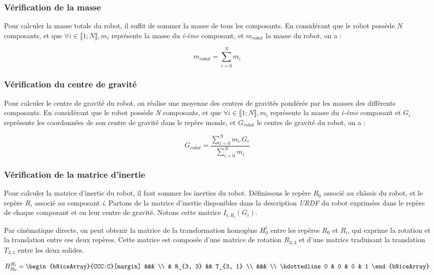 			\subsubsection{Vérification de la masse}

				Pour calculer la masse totale du robot, il suffit de sommer la masse de tous les composants. En considérant que le robot possède \textit{N} composants, et que $\forall i \in \llbracket 1; N \rrbracket, m_i$ représente la masse du \textit{i-ème} composant, et $m_{robot}$ la masse du robot, on a :

				$$m_{robot} = \sum_{i=0}^{N}m_i$$

			\subsubsection{Vérification du centre de gravité}

				Pour calculer le centre de gravité du robot, on réalise une moyenne des centres de gravités pondérée par les masses des différents composants. En considérant que le robot possède \textit{N} composants, et que $\forall i \in \llbracket 1; N \rrbracket, m_i$ représente la masse du \textit{i-ème} composant et $G_i$ représente les coordonnées de son centre de gravité dans le repère monde, et $G_{robot}$ le centre de gravité du robot, on a :

				$$G_{robot} = \frac{\sum_{i=0}^{N}m_i.G_i}{\sum_{i=0}^{N}m_i}$$

			\subsubsection{Vérification de la matrice d'inertie}

				Pour calculer la matrice d'inertie du robot, il faut sommer les inerties du robot. Définissons le repère $R_0$ associé au châssis du robot, et le repère $R_i$ associé au composant \textit{i}. Partons de la matrice d'inertie disponibles dans la description \textit{URDF} du robot exprimées dans le repère de chaque composant et en leur centre de gravité. Notons cette matrice $I_{i, R_i}(G_i)$. 
				
				Par cinématique directe, on peut obtenir la matrice de la transformation homogène $H_0^i$ entre les repères $R_0$ et $R_i$, qui exprime la rotation et la translation entre ces deux repères. Cette matrice est composée d'une matrice de rotation $R_{3, 3}$ et d'une matrice traduisant la translation $T_{3, 1}$ entre les deux solides.

				$$H_{R_0}^{R_i} = \begin{bNiceArray}{CCC:C}[margin] &&& \\ & R_{3, 3} && T_{3, 1} \\ &&& \\ \hdottedline 0 & 0 & 0 & 1 \end{bNiceArray}$$

